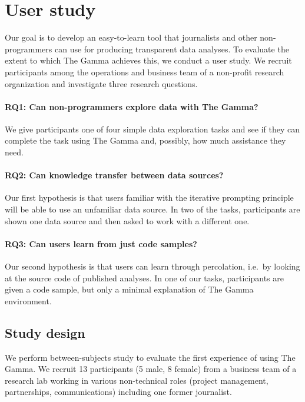 \documentclass[manuscript,review,anonymous]{acmart}
\begin{document}

\section{User study}
\label{sec:study}

Our goal is to develop an easy-to-learn tool that journalists and other non-programmers can use
for producing transparent data analyses. To evaluate the extent to which The Gamma achieves this,
we conduct a user study. We recruit participants among the operations and business team of a
non-profit research organization and investigate three research questions.

\paragraph{RQ1: Can non-programmers explore data with The Gamma?}
We give participants one of four simple data exploration tasks and see if they can complete the
task using The Gamma and, possibly, how much assistance they need.

\paragraph{RQ2: Can knowledge transfer between data sources?}
Our first hypothesis is that users familiar with the iterative prompting principle will be able to
use an unfamiliar data source. In two of the tasks, participants are shown one data source and
then asked to work with a different one.

\paragraph{RQ3: Can users learn from just code samples?}
Our second hypothesis is that users can learn through percolation, i.e.~by looking at the source
code of published analyses. In one of our tasks, participants are given a code sample, but only a
minimal explanation of The Gamma environment.

\subsection{Study design}
We perform between-subjects study to evaluate the first experience of using The Gamma.
We recruit 13 participants (5 male, 8 female) from a business team
of a research lab working in various non-technical roles (project management,
partnerships, communications) including one former journalist.
\end{document}
